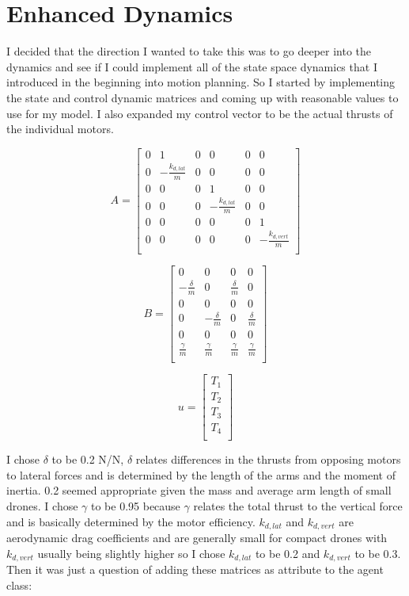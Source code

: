 \documentclass{article}
\begin{document}
\section*{Enhanced Dynamics}

I decided that the direction I wanted to take this was to go deeper into the dynamics and see if I could implement all of the state space dynamics that I introduced in the beginning into motion planning.
So I started by implementing the state and control dynamic matrices and coming up with reasonable values to use for my model.
I also expanded my control vector to be the actual thrusts of the individual motors.

\[
A = 
\begin{bmatrix}
0 & 1 & 0 & 0 & 0 & 0 \\
0 & -\frac{k_{d,lat}}{m} & 0 & 0 & 0 & 0 \\
0 & 0 & 0 & 1 & 0 & 0 \\
0 & 0 & 0 & -\frac{k_{d,lat}}{m} & 0 & 0 \\
0 & 0 & 0 & 0 & 0 & 1 \\
0 & 0 & 0 & 0 & 0 & -\frac{k_{d,vert}}{m} \\
\end{bmatrix}
\]

\[
B = 
\begin{bmatrix}
0 & 0 & 0 & 0 \\
-\frac{\delta}{m} & 0 & \frac{\delta}{m} & 0 \\
0 & 0 & 0 & 0 \\
0 & -\frac{\delta}{m} & 0 & \frac{\delta}{m} \\
0 & 0 & 0 & 0 \\
\frac{\gamma}{m} & \frac{\gamma}{m} & \frac{\gamma}{m} & \frac{\gamma}{m} \\
\end{bmatrix}
\]

\[
u = 
\begin{bmatrix}
T_1 \\
T_2 \\
T_3 \\
T_4 \\
\end{bmatrix}
\]

I chose $\delta$ to be 0.2 N/N, $\delta$ relates differences in the thrusts from opposing motors to lateral forces and is determined by the length of the arms and the moment of inertia.
0.2 seemed appropriate given the mass and average arm length of small drones.
I chose $\gamma$ to be 0.95 because $\gamma$ relates the total thrust to the vertical force and is basically determined by the motor efficiency.
$k_{d,lat}$ and $k_{d,vert}$ are aerodynamic drag coefficients and are generally small for compact drones with $k_{d,vert}$ usually being slightly higher so I chose $k_{d,lat}$ to be 0.2 and $k_{d,vert}$ to be 0.3.
Then it was just a question of adding these matrices as attribute to the agent class:
\end{document}
